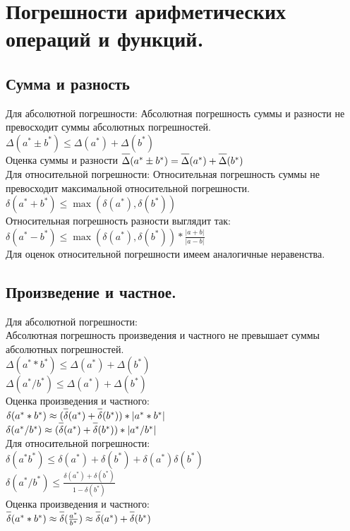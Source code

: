 \documentclass[16pt]{article}
\begin{document}
		\section {Погрешности арифметических операций и функций.}
			\subsection {Сумма и разность}
				Для абсолютной погрешности:
				Абсолютная погрешность суммы и разности не превосходит суммы абсолютных погрешностей.
				$\Delta(a^{*} \pm b^{*}) \leq \Delta(a^{*}) + \Delta(b^{*})$\\
				Оценка суммы и разности
				$\overline{\raisebox{3mm}{} \Delta}(a^{*} \pm b^{*}) = 
				\overline{\raisebox{3mm}{} \Delta}(a^{*}) + \overline{\raisebox{3mm}{} \Delta}(b^{*})$\\
				Для относительной погрешности:
				Относительная погрешность суммы не превосходит максимальной относительной погрешности.\\
				$\delta (a^{*} + b^{*}) \leq \max(\delta(a^{*}),\delta(b^{*}))$\\
				Относительная погрешность разности выглядит так: \\
				$\delta (a^{*} - b^{*}) \leq \max(\delta(a^{*}),\delta(b^{*})) * \frac{|a+b|}{|a-b|}$\\
				Для оценок относительной погрешности имеем аналогичные неравенства.
			\subsection {Произведение и частное.}
				Для абсолютной погрешности:\\
				Абсолютная погрешность произведения и частного не превышает суммы абсолютных погрешностей.\\
				$\Delta(a^{*} * b^{*}) \leq \Delta(a^{*}) + \Delta(b^{*})$\\
				$\Delta(a^{*} / b^{*}) \leq \Delta(a^{*}) + \Delta(b^{*})$\\
				Оценка произведения и частного:\\
				$\delta(a^{*}*b^{*}) \approx (\overline{\raisebox{3mm}{} \delta}(a^{*}) + \overline{\raisebox{3mm}{} \delta}(b^{*}))*|a^{*}*b^{*}|$\\
				$\delta(a^{*}/b^{*}) \approx (\overline{\raisebox{3mm}{} \delta}(a^{*}) + \overline{\raisebox{3mm}{} \delta}(b^{*}))*|a^{*}/b^{*}|$\\
				Для относительной погрешности:\\
				$\delta (a^{*}b^{*}) \leq \delta(a^{*}) + \delta(b^{*}) + \delta(a^{*})\delta(b^{*})$\\
				$\delta (a^{*}/b^{*}) \leq \frac{\delta(a^{*}) + \delta(b^{*})}{1 - \delta(b^{*})}$\\
				Оценка произведения и частного:\\
				$\overline{\raisebox{3mm}{} \delta}(a^{*}*b^{*}) \approx \overline{\raisebox{3mm}{} \delta}(\frac{a^{*}}{b^{*}}) \approx \overline{\raisebox{3mm}{} \delta}(a^{*}) + \overline{\raisebox{3mm}{} \delta}(b^{*})$
\end{document}
